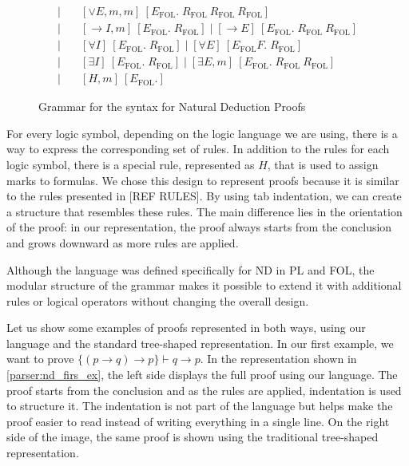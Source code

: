 \begin{figure}[H]
{\begin{align*}
       \mid &\quad [\lor E, m, m]\ [E_\text{FOL}.\;R_\text{FOL}\ R_\text{FOL}\ R_\text{FOL}] \\
       \mid &\quad [\to\!I, m]\ [E_\text{FOL}.\;R_\text{FOL}] \mid [\to\!E]\ [E_\text{FOL}.\;R_\text{FOL}\ R_\text{FOL}] \\
       \mid &\quad [\forall I]\ [E_\text{FOL}.\;R_\text{FOL}] \mid  [\forall E]\ [E_\text{FOL}F.\;R_\text{FOL}] \\
       \mid &\quad [\exists I]\ [E_\text{FOL}.\;R_\text{FOL}] \mid [\exists E, m]\ [E_\text{FOL}.\;R_\text{FOL}\ R_\text{FOL}] \\
       \mid &\quad [H, m]\ [E_\text{FOL}.]
\end{align*}
}
\caption{Grammar for the syntax for Natural Deduction Proofs}
\label{parser:nd}
\end{figure}

For every logic symbol, depending on the logic language we are using, there is a way to express the corresponding set of rules. In addition to the rules for each logic symbol, there is a special rule, represented as \(H\), that is used to assign marks to formulas. We chose this design to represent proofs because it is similar to the rules presented in [REF RULES]. By using tab indentation, we can create a structure that resembles these rules. The main difference lies in the orientation of the proof: in our representation, the proof always starts from the conclusion and grows downward as more rules are applied.

Although the language was defined specifically for \gls{ND} in \gls{PL} and \gls{FOL}, the modular structure of the grammar makes it possible to extend it with additional rules or logical operators without changing the overall design.

Let us show some examples of proofs represented in both ways, using our language and the standard tree-shaped representation. In our first example, we want to prove \(\{(p \to q) \to p\} \vdash q \to p\). In the representation shown in \autoref{parser:nd_firs_ex}, the left side displays the full proof using our language. The proof starts from the conclusion and as the rules are applied, indentation is used to structure it. The indentation is not part of the language but helps make the proof easier to read instead of writing everything in a single line. On the right side of the image, the same proof is shown using the traditional tree-shaped representation.

